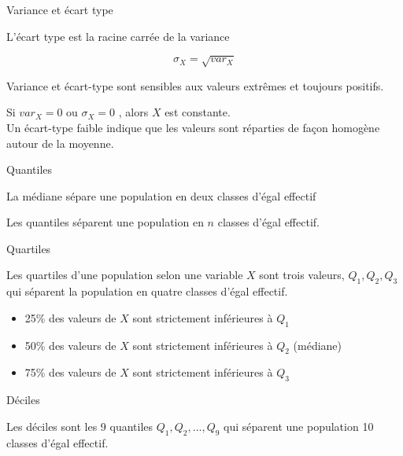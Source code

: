 \documentclass{beamer}
\begin{document}
\begin{frame}{Variance et écart type}


L'\alert{écart type} est la racine carrée de la variance


$$\sigma_X = \sqrt{var_X}$$ 



Variance et écart-type sont sensibles aux valeurs extrêmes et toujours positifs.\\
\vspace{0.5cm}

\begin{scriptsize}
\begin{spacing}{1}
Si $var_X = 0$ ou $\sigma_X = 0$ , alors $X$ est \alert{constante}.\\

Un écart-type faible indique que les valeurs sont réparties de façon \alert{homogène} autour de la moyenne.
\end{spacing}
\end{scriptsize}
\end{frame}


\begin{frame}{Quantiles}
 

La \alert{médiane} sépare une population en \alert{deux} classes d'égal effectif 

Les \alert{quantiles}  séparent une population en \alert{$n$} classes d'égal effectif.
\end{frame}


\begin{frame}{Quartiles}




Les \alert{quartiles} d'une population selon une variable $X$ sont trois valeurs, $Q_1,Q_2,Q_3$ qui séparent la population en \alert{quatre} classes d'égal effectif.

\begin{itemize}
  \item 25\% des valeurs de $X$ sont strictement inférieures à $Q_1$
  \item 50\% des valeurs de $X$ sont strictement inférieures à $Q_2$ (médiane)
  \item 75\% des valeurs de $X$ sont strictement inférieures à $Q_3$
\end{itemize}
\end{frame}


\begin{frame}{Déciles}



Les déciles sont les \alert{9} quantiles $Q_1,Q_2,\dots,Q_9$ qui séparent une population  \alert{10} classes d'égal effectif.

\end{frame}
\end{document}
